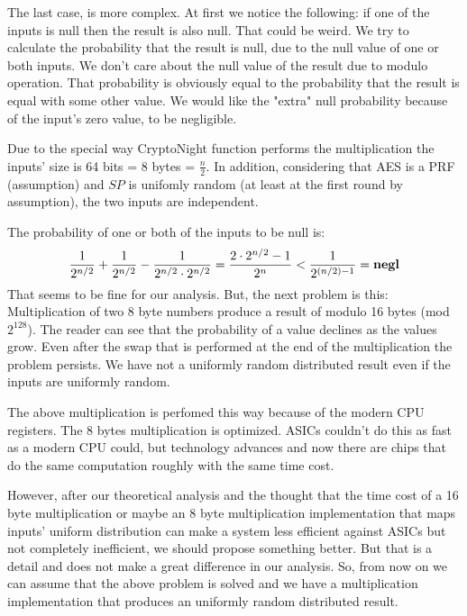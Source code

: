 The last case, is more complex. At first we notice the following: if one of the inputs is null then the result is also null. That could be weird. We try to calculate the probability that the result is null, due to the null value of one or both inputs. We don't care about the null value of the result due to modulo operation. That probability is obviously equal to the probability that the result is equal with some other value. We would like the "extra" null probability because of the input's zero value, to be negligible.

Due to the special way CryptoNight function performs the multiplication the inputs' size is 64 bits = 8 bytes = $\frac{n}{2}$. In addition, considering that AES is a PRF (assumption) and $SP$ is unifomly random (at least at the first round by assumption), the two inputs are independent.

\noindent The probability of one or both of the inputs to be null is:
\begin{equation} \label{prob_zero}
  \frac{1}{2^{n/2}} + \frac{1}{2^{n/2}} - \frac{1}{2^{n/2} \cdot 2^{n/2}} = \frac{2\cdot2^{n/2}-1}{2^n} < \frac{1}{2^{(n/2)-1}} = \mbox{\textbf{negl}}
\end{equation}
That seems to be fine for our analysis. But, the next problem is this: Multiplication of two 8 byte numbers produce a result of modulo 16 bytes (mod $2^{128}$). The reader can see that the probability of a value declines as the values grow. Even after the swap that is performed at the end of the multiplication the problem persists. We have not a uniformly random distributed result even if the inputs are uniformly random.

The above multiplication is perfomed this way because of the modern CPU registers. The 8 bytes multiplication is optimized. ASICs couldn't do this as fast as a modern CPU could, but technology advances and now there are chips that do the same computation roughly with the same time cost.

However, after our theoretical analysis and the thought that the time cost of a 16 byte multiplication or maybe an 8 byte multiplication implementation that maps inputs' uniform distribution can make a system less efficient against ASICs but not completely inefficient, we should propose something better. But that is a detail and does not make a great difference in our analysis. So, from now on we can assume that the above problem is solved and we have a multiplication implementation that produces an uniformly random distributed result.

